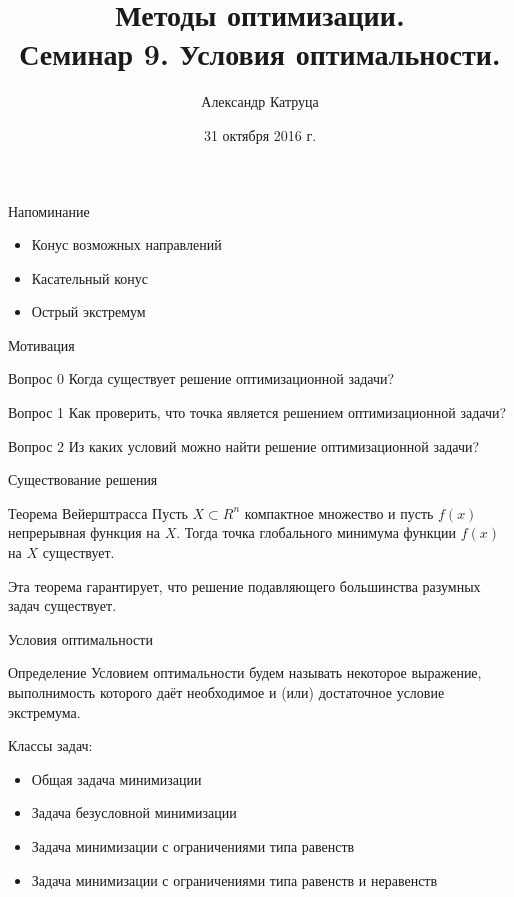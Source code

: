 \documentclass[12pt,russian]{beamer}
\title[Семинар 9]{Методы оптимизации. \\
 Семинар 9. Условия оптимальности.}
\author{Александр Катруца}
\institute{Московский физико-технический институт,\\
Факультет Управления и Прикладной Математики}
\date{31 октября 2016 г.}
\begin{document}
\begin{frame}
\maketitle
\end{frame}

\begin{frame}{Напоминание}
\begin{itemize}
\item Конус возможных направлений
\item Касательный конус
\item Острый экстремум
\end{itemize}
\end{frame}

\begin{frame}{Мотивация}

\begin{block}{Вопрос 0}
Когда существует решение оптимизационной задачи?
\end{block}

\begin{block}{Вопрос 1}
Как проверить, что точка является решением оптимизационной задачи? 
\end{block}

\begin{block}{Вопрос 2}
Из каких условий можно найти решение оптимизационной задачи?
\end{block}
\end{frame}

\begin{frame}{Существование решения}
\begin{block}{Теорема Вейерштрасса}
Пусть $X \subset R^n$ компактное множество и пусть $f(x)$ непрерывная функция на $X$. 
Тогда точка глобального минимума функции $f (x)$ на $X$ существует.
\end{block}

Эта теорема гарантирует, что решение подавляющего большинства разумных задач существует.
 
\end{frame}

\begin{frame}{Условия оптимальности}
\begin{block}{Определение}
Условием оптимальности будем называть некоторое выражение, выполнимость которого даёт необходимое и (или) достаточное условие экстремума. 
\end{block}
Классы задач:
\begin{itemize}
\item Общая задача минимизации
\item Задача безусловной минимизации
\item Задача минимизации с ограничениями типа равенств
\item Задача минимизации с ограничениями типа равенств и неравенств
\end{itemize}
\end{frame}
\end{document}
